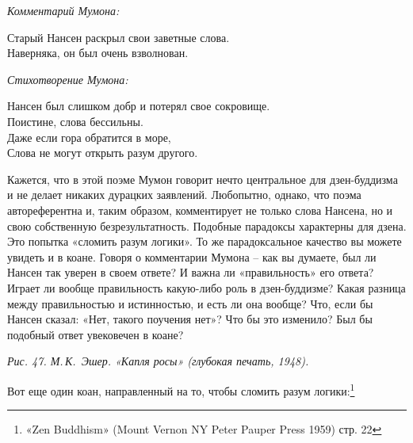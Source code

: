 \documentclass[../main.tex]{subfiles}
\begin{document}
\begin{koan}
    \emph{\normalsize Комментарий Мумона:}
    \vspace{2pt}

    Старый Нансен раскрыл свои заветные слова. \\
    Наверняка, он был очень взволнован.
\end{koan}

\begin{koan}
    \emph{\normalsize Стихотворение Мумона:}

    \begin{mumonverse}
        Нансен был слишком добр и потерял свое сокровище. \\
        Поистине, слова бессильны. \\
        Даже если гора обратится в море, \\
        Слова не могут открыть разум другого.
    \end{mumonverse}
\end{koan}

Кажется, что в этой поэме Мумон говорит нечто центральное для дзен-буддизма и не делает никаких дурацких заявлений. Любопытно, однако, что поэма автореферентна и, таким образом, комментирует не только слова Нансена, но и свою собственную безрезультатность. Подобные парадоксы характерны для дзена. Это попытка «сломить разум логики». То же парадоксальное качество вы можете увидеть и в коане. Говоря о комментарии Мумона \--- как вы думаете, был ли Нансен так уверен в своем ответе? И важна ли «правильность» его ответа? Играет ли вообще правильность какую-либо роль в дзен-буддизме? Какая разница между правильностью и истинностью, и есть ли она вообще? Что, если бы Нансен сказал: «Нет, такого поучения нет»? Что бы это изменило? Был бы подобный ответ увековечен в коане?

\emph{Рис. 47. М.\,К.~Эшер. «Капля росы» (глубокая печать, 1948).}

Вот еще один коан, направленный на то, чтобы сломить разум логики:\footnote{«Zen Buddhism» (Mount Vernon NY Peter Pauper Press 1959) стр. 22}
\end{document}
